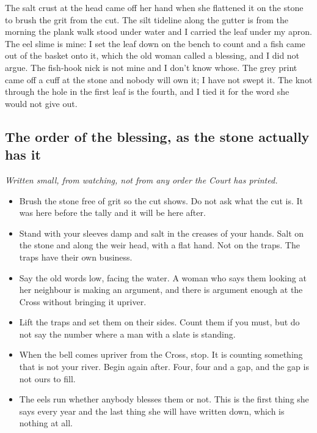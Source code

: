 \documentclass{design/chronicle}
\begin{document}
The salt crust at the head came off her hand when she flattened it on the stone to brush the grit from the cut. The silt tideline along the gutter is from the morning the plank walk stood under water and I carried the leaf under my apron. The eel slime is mine: I set the leaf down on the bench to count and a fish came out of the basket onto it, which the old woman called a blessing, and I did not argue. The fish-hook nick is not mine and I don’t know whose. The grey print came off a cuff at the stone and nobody will own it; I have not swept it. The knot through the hole in the first leaf is the fourth, and I tied it for the word she would not give out.

\subsection*{The order of the blessing, as the stone actually has it}

\emph{Written small, from watching, not from any order the Court has printed.}

\begin{itemize}[leftmargin=1.4em,itemsep=1pt,topsep=3pt,parsep=0pt]

\item Brush the stone free of grit so the cut shows. Do not ask what the cut is. It was here before the tally and it will be here after.

\item Stand with your sleeves damp and salt in the creases of your hands. Salt on the stone and along the weir head, with a flat hand. Not on the traps. The traps have their own business.

\item Say the old words low, facing the water. A woman who says them looking at her neighbour is making an argument, and there is argument enough at the Cross without bringing it upriver.

\item Lift the traps and set them on their sides. Count them if you must, but do not say the number where a man with a slate is standing.

\item When the bell comes upriver from the Cross, stop. It is counting something that is not your river. Begin again after. Four, four and a gap, and the gap is not ours to fill.

\item The eels run whether anybody blesses them or not. This is the first thing she says every year and the last thing she will have written down, which is nothing at all.

\end{itemize}
\end{document}
